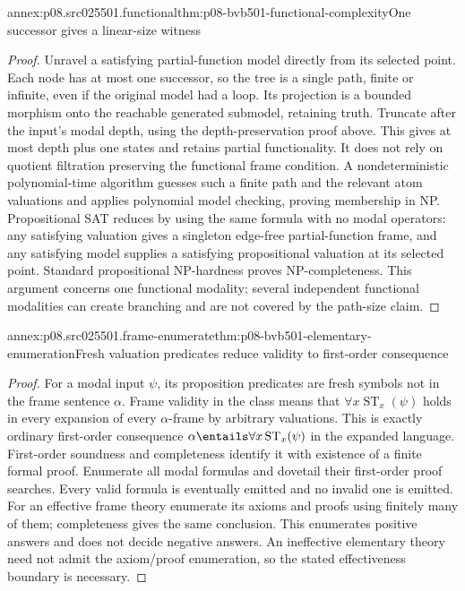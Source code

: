 \begin{annexitem}{annex:p08.src025501.functional}{thm:p08-bvb501-functional-complexity}{One successor gives a linear-size witness}
\begin{proof}
Unravel a satisfying partial-function model directly from its selected
point. Each node has at most one successor, so the tree is a single
path, finite or infinite, even if the original model had a loop.
Its projection is a bounded morphism onto the reachable generated
submodel, retaining truth. Truncate after the input's modal depth,
using the depth-preservation proof above. This gives at most depth
plus one states and retains partial functionality. It does not rely
on quotient filtration preserving the functional frame condition.
A nondeterministic polynomial-time algorithm guesses such a finite
path and the relevant atom valuations and applies polynomial model
checking, proving membership in NP. Propositional SAT reduces by
using the same formula with no modal operators: any satisfying
valuation gives a singleton edge-free partial-function frame, and
any satisfying model supplies a satisfying propositional valuation
at its selected point. Standard propositional NP-hardness proves
NP-completeness. This argument concerns one functional modality;
several independent functional modalities can create branching and
are not covered by the path-size claim.
\end{proof}
\end{annexitem}

\begin{annexitem}{annex:p08.src025501.frame-enumerate}{thm:p08-bvb501-elementary-enumeration}{Fresh valuation predicates reduce validity to first-order consequence}
\begin{proof}
For a modal input \(\psi\), its proposition predicates are fresh
symbols not in the frame sentence \(\alpha\). Frame validity in
the class means that \(\forall x\operatorname{ST}_x(\psi)\)
holds in every expansion of every \(\alpha\)-frame by arbitrary
valuations. This is exactly ordinary first-order consequence
\(\alpha\entails\forall x\operatorname{ST}_x(\psi)\)
in the expanded language. First-order soundness and completeness
identify it with existence of a finite formal proof. Enumerate all
modal formulas and dovetail their first-order proof searches. Every
valid formula is eventually emitted and no invalid one is emitted.
For an effective frame theory enumerate its axioms and proofs using
finitely many of them; completeness gives the same conclusion. This
enumerates positive answers and does not decide negative answers.
An ineffective elementary theory need not admit the axiom/proof
enumeration, so the stated effectiveness boundary is necessary.
\end{proof}
\end{annexitem}

